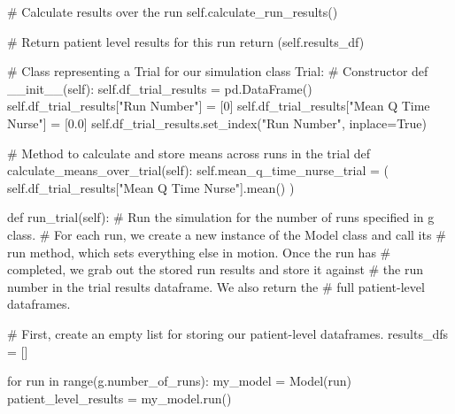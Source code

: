 \documentclass[
  letterpaper,
  DIV=11,
  numbers=noendperiod]{scrreprt}
\newenvironment{Shaded}{\begin{snugshade}}{\end{snugshade}}
\newcommand{\BuiltInTok}[1]{\textcolor[rgb]{0.00,0.23,0.31}{#1}}
\newcommand{\CommentTok}[1]{\textcolor[rgb]{0.37,0.37,0.37}{#1}}
\newcommand{\ControlFlowTok}[1]{\textcolor[rgb]{0.00,0.23,0.31}{#1}}
\newcommand{\DecValTok}[1]{\textcolor[rgb]{0.68,0.00,0.00}{#1}}
\newcommand{\FloatTok}[1]{\textcolor[rgb]{0.68,0.00,0.00}{#1}}
\newcommand{\FunctionTok}[1]{\textcolor[rgb]{0.28,0.35,0.67}{#1}}
\newcommand{\KeywordTok}[1]{\textcolor[rgb]{0.00,0.23,0.31}{#1}}
\newcommand{\NormalTok}[1]{\textcolor[rgb]{0.00,0.23,0.31}{#1}}
\newcommand{\OperatorTok}[1]{\textcolor[rgb]{0.37,0.37,0.37}{#1}}
\newcommand{\StringTok}[1]{\textcolor[rgb]{0.13,0.47,0.30}{#1}}
\newcommand{\VariableTok}[1]{\textcolor[rgb]{0.07,0.07,0.07}{#1}}
\begin{document}
\begin{Shaded}
\begin{Highlighting}[]
        \CommentTok{\# Calculate results over the run}
        \VariableTok{self}\NormalTok{.calculate\_run\_results()}

        \CommentTok{\# Return patient level results for this run}
        \ControlFlowTok{return}\NormalTok{ (}\VariableTok{self}\NormalTok{.results\_df)}

\CommentTok{\# Class representing a Trial for our simulation}
\KeywordTok{class}\NormalTok{ Trial:}
    \CommentTok{\# Constructor}
    \KeywordTok{def}  \FunctionTok{\_\_init\_\_}\NormalTok{(}\VariableTok{self}\NormalTok{):}
        \VariableTok{self}\NormalTok{.df\_trial\_results }\OperatorTok{=}\NormalTok{ pd.DataFrame()}
        \VariableTok{self}\NormalTok{.df\_trial\_results[}\StringTok{"Run Number"}\NormalTok{] }\OperatorTok{=}\NormalTok{ [}\DecValTok{0}\NormalTok{]}
        \VariableTok{self}\NormalTok{.df\_trial\_results[}\StringTok{"Mean Q Time Nurse"}\NormalTok{] }\OperatorTok{=}\NormalTok{ [}\FloatTok{0.0}\NormalTok{]}
        \VariableTok{self}\NormalTok{.df\_trial\_results.set\_index(}\StringTok{"Run Number"}\NormalTok{, inplace}\OperatorTok{=}\VariableTok{True}\NormalTok{)}

    \CommentTok{\# Method to calculate and store means across runs in the trial}
    \KeywordTok{def}\NormalTok{ calculate\_means\_over\_trial(}\VariableTok{self}\NormalTok{):}
        \VariableTok{self}\NormalTok{.mean\_q\_time\_nurse\_trial }\OperatorTok{=}\NormalTok{ (}
            \VariableTok{self}\NormalTok{.df\_trial\_results[}\StringTok{"Mean Q Time Nurse"}\NormalTok{].mean()}
\NormalTok{        )}

    \KeywordTok{def}\NormalTok{ run\_trial(}\VariableTok{self}\NormalTok{):}
        \CommentTok{\# Run the simulation for the number of runs specified in g class.}
        \CommentTok{\# For each run, we create a new instance of the Model class and call its}
        \CommentTok{\# run method, which sets everything else in motion.  Once the run has}
        \CommentTok{\# completed, we grab out the stored run results and store it against}
        \CommentTok{\# the run number in the trial results dataframe. We also return the}
        \CommentTok{\# full patient{-}level dataframes.}

        \CommentTok{\# First, create an empty list for storing our patient{-}level dataframes.}
\NormalTok{        results\_dfs }\OperatorTok{=}\NormalTok{ []}

        \ControlFlowTok{for}\NormalTok{ run }\KeywordTok{in} \BuiltInTok{range}\NormalTok{(g.number\_of\_runs):}
\NormalTok{            my\_model }\OperatorTok{=}\NormalTok{ Model(run)}
\NormalTok{            patient\_level\_results }\OperatorTok{=}\NormalTok{ my\_model.run()}


\end{Highlighting}
\end{Shaded}
\end{document}
